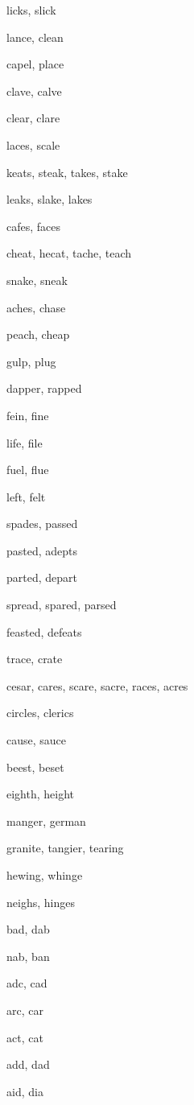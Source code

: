     \item licks, slick
    \item lance, clean
    \item capel, place
    \item clave, calve
    \item clear, clare
    \item laces, scale
    \item keats, steak, takes, stake
    \item leaks, slake, lakes
    \item cafes, faces
    \item cheat, hecat, tache, teach
    \item snake, sneak
    \item aches, chase
    \item peach, cheap
    \item gulp, plug
    \item dapper, rapped
    \item fein, fine
    \item life, file
    \item fuel, flue
    \item left, felt
    \item spades, passed
    \item pasted, adepts
    \item parted, depart
    \item spread, spared, parsed
    \item feasted, defeats
    \item trace, crate
    \item cesar, cares, scare, sacre, races, acres
    \item circles, clerics
    \item cause, sauce
    \item beest, beset
    \item eighth, height
    \item manger, german
    \item granite, tangier, tearing
    \item hewing, whinge
    \item neighs, hinges
    \item bad, dab
    \item nab, ban
    \item adc, cad
    \item arc, car
    \item act, cat
    \item add, dad
    \item aid, dia
